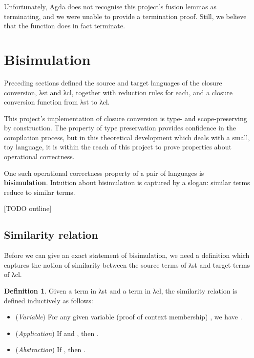 \documentclass[bsc,frontabs,oneside,singlespacing,parskip,deptreport]{infthesis}
\theoremstyle{definition}
\newtheorem*{definition}{Definition}
\begin{document}
Unfortunately, Agda does not recognise this project's fusion lemmas as
terminating, and we were unable to provide a termination proof. Still,
we believe that the function does in fact terminate.

\section{Bisimulation}
\label{sec:bisimulation}

Preceding sections defined the source and target languages of the
closure conversion, λst and λcl, together with reduction rules for
each, and a closure conversion function  from λst to λcl.

This project's implementation of closure conversion is type- and
scope-preserving by construction. The property of type preservation
provides confidence in the compilation process, but in this
theoretical development which deals with a small, toy language, it is
within the reach of this project to prove properties about operational
correctness.

One such operational correctness property of a pair of languages is
\textbf{bisimulation}. Intuition about bisimulation is captured by a
slogan: similar terms reduce to similar terms.

[TODO outline]

\subsection{Similarity relation}
\label{sec:similarity-relation}

Before we can give an exact statement of bisimulation, we need a
definition which captures the notion of similarity between the source
terms of λst and target terms of λcl.

\begin{definition}
  Given a term  in λst and a term  in λcl,
  the similarity relation  is defined inductively as
  follows:

  \begin{itemize}
  \item (\textit{Variable}) For any given variable (proof of context
    membership) , we have .

  \item (\textit{Application}) If  and ,
    then .

  \item (\textit{Abstraction}) If ,
    then .
    
  \end{itemize}
\end{definition}
\end{document}
